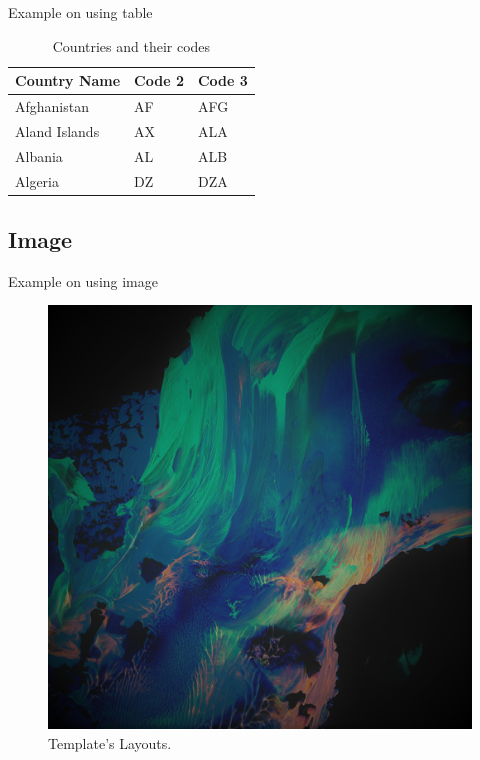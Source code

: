 \begin{frame}{Example on using table}

    \begin{table}[]
        \centering
        \caption{\label{tab:1}Countries and their codes}
        
        \renewcommand{\arraystretch}{1.5}
        \setlength{\tabcolsep}{10pt}
        
        {
            \begin{tabular}{ p{3cm}p{3cm}p{3cm}  }
                \toprule 
                \textbf{Country Name} & \textbf{Code 2} & \textbf{Code 3} \\
                \midrule
                Afghanistan & AF &AFG \\
                Aland Islands & AX   & ALA \\
                Albania &AL & ALB \\
                Algeria    &DZ & DZA \\
                \bottomrule
            \end{tabular}
        }
    \end{table}
    
\end{frame}

\subsection{Image}

\begin{frame}{Example on using image}

    \begin{figure}
        \centering
        \includegraphics[width=.9\textwidth]{assets/img/background.png}
        \caption{Template's Layouts.}
        \label{fig:layouts}
    \end{figure}
    
\end{frame}



